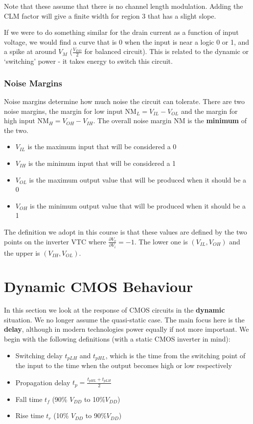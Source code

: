 \documentclass[11pt]{report}
\begin{document}
Note that these assume that there is no channel length modulation. Adding the CLM factor will give a finite width for region 3 that has a slight slope.

If we were to do something similar for the drain current as a function of input voltage, we would find a curve that is 0 when the input is near a logic 0 or 1, and a spike at around $V_M$ ($\frac{V_{DD}}{2}$ for balanced circuit). This is related to the dynamic or `switching' power - it takes energy to switch this circuit.

\subsection*{Noise Margins}
Noise margins determine how much noise the circuit can tolerate. There are two noise margins, the margin for low input NM$_L = V_{IL} - V_{OL}$ and the margin for high input NM$_H = V_{OH} - V_{IH}$. The overall noise margin NM is the \textbf{minimum} of the two.

\begin{itemize}
	\item $V_{IL}$ is the maximum input that will be considered a 0
	\item $V_{IH}$ is the minimum input that will be considered a 1
	\item $V_{OL}$ is the maximum output value that will be produced when it should be a 0
	\item $V_{OH}$ is the minimum output value that will be produced when it should be a 1
\end{itemize}

The definition we adopt in this course is that these values are defined by the two points on the inverter VTC where $\frac{\partial V_o}{\partial V_i} = -1$. The lower one is $(V_{IL}, V_{OH})$ and the upper is $(V_{IH}, V_{OL})$.

\chapter{Dynamic CMOS Behaviour}
In this section we look at the response of CMOS circuits in the \textbf{dynamic} situation. We no longer assume the quasi-static case. The main focus here is the \textbf{delay}, although in modern technologies power equally if not more important. We begin with the following definitions (with a static CMOS inverter in mind):

\begin{itemize}
	\item Switching delay $t_{pLH}$ and $t_{pHL}$, which is the time from the switching point of the input to the time when the output becomes high or low respectively
	\item Propagation delay $t_p = \frac{t_{pHL} + t_{pLH}}{2}$
	\item Fall time $t_{f}$ (90\% $V_{DD}$ to 10\%$V_{DD}$)
	\item Rise time $t_{r}$ (10\% $V_{DD}$ to 90\%$V_{DD}$)
\end{itemize}
\end{document}
